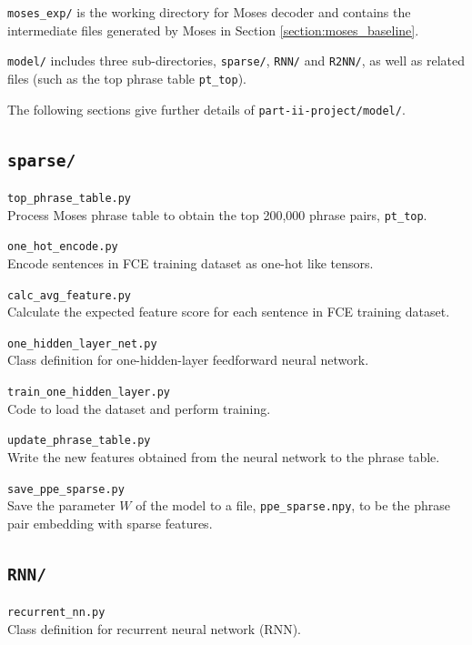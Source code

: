 \documentclass[12pt,a4paper,twoside]{report}
\begin{document}
\hfill\begin{minipage}{\dimexpr\textwidth-0.8cm}
    \texttt{moses\_exp/} is the working directory for Moses decoder and contains the intermediate files generated by Moses in Section \ref{section:moses_baseline}.
\end{minipage}

\hfill\begin{minipage}{\dimexpr\textwidth-0.8cm}
    \texttt{model/} includes three sub-directories, \texttt{sparse/}, \texttt{RNN/} and \texttt{R2NN/}, as well as related files (such as the top phrase table \texttt{pt\_top}).
\end{minipage}

The following sections give further details of \texttt{part-ii-project/model/}.

\subsection{\texttt{sparse/}}
\texttt{top\_phrase\_table.py}\\
Process Moses phrase table to obtain the top 200,000 phrase pairs, \texttt{pt\_top}.

\texttt{one\_hot\_encode.py}\\
Encode sentences in FCE training dataset as one-hot like tensors.

\texttt{calc\_avg\_feature.py}\\
Calculate the expected feature score for each sentence in FCE training dataset.

\texttt{one\_hidden\_layer\_net.py}\\
Class definition for one-hidden-layer feedforward neural network.

\texttt{train\_one\_hidden\_layer.py}\\
Code to load the dataset and perform training.

\texttt{update\_phrase\_table.py}\\
Write the new features obtained from the neural network to the phrase table.

\texttt{save\_ppe\_sparse.py}\\
Save the parameter $W$ of the model to a file, \texttt{ppe\_sparse.npy}, to be the phrase pair embedding with sparse features.

\subsection{\texttt{RNN/}}
\texttt{recurrent\_nn.py}\\
Class definition for recurrent neural network (RNN).
\end{document}

